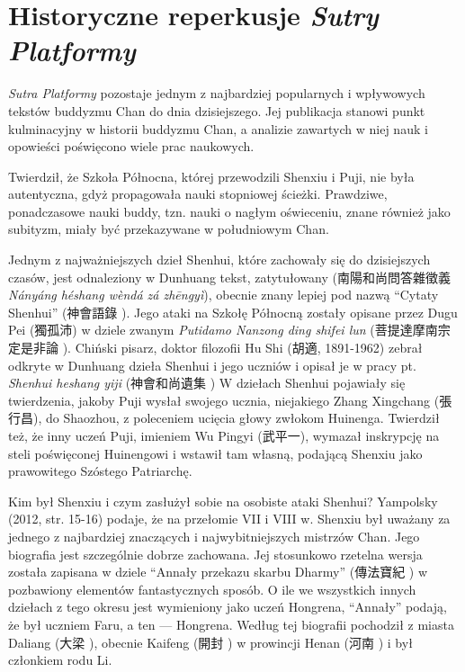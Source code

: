 \chapter{Historyczne reperkusje \textit{Sutry Platformy}}
\textit{Sutra Platformy} pozostaje jednym z najbardziej popularnych i wpływowych tekstów buddyzmu Chan do dnia dzisiejszego. Jej publikacja stanowi punkt kulminacyjny w historii buddyzmu Chan, a analizie zawartych w niej nauk i opowieści poświęcono wiele prac naukowych.

Twierdził, że Szkoła Północna, której przewodzili Shenxiu i Puji, nie była autentyczna, gdyż propagowała nauki stopniowej ścieżki. Prawdziwe, ponadczasowe nauki buddy, tzn. nauki o nagłym oświeceniu, znane również jako subityzm, miały być przekazywane w południowym Chan.

Jednym z najważniejszych dzieł Shenhui, które zachowały się do dzisiejszych czasów, jest odnaleziony w Dunhuang tekst, zatytułowany  (南陽和尚問答雜徵義 \textit{Nányáng héshang wèndá zá zhēngyì}), obecnie znany lepiej pod nazwą ``Cytaty Shenhui'' (神會語錄 ).
Jego ataki na Szkołę Północną zostały opisane przez Dugu Pei (獨孤沛) w dziele zwanym \textit{Putidamo Nanzong ding shifei lun} (菩提達摩南宗定是非論 ).
Chiński pisarz, doktor filozofii Hu Shi (胡適, 1891-1962) zebrał odkryte w Dunhuang dzieła Shenhui i jego uczniów i opisał je w pracy pt. \textit{Shenhui heshang yiji} (神會和尚遺集 )
W dziełach Shenhui pojawiały się twierdzenia, jakoby Puji wysłał swojego ucznia, niejakiego Zhang Xingchang (張行昌), do Shaozhou, z poleceniem ucięcia głowy zwłokom Huinenga.
Twierdził też, że inny uczeń Puji, imieniem Wu Pingyi (武平一), wymazał inskrypcję na steli poświęconej Huinengowi i wstawił tam własną, podającą Shenxiu jako prawowitego Szóstego Patriarchę.

Kim był Shenxiu i czym zasłużył sobie na osobiste ataki Shenhui? Yampolsky (2012, str. 15-16) podaje, że na przełomie VII i VIII w. Shenxiu był uważany za jednego z najbardziej znaczących i najwybitniejszych mistrzów Chan.
Jego biografia jest szczególnie dobrze zachowana. Jej stosunkowo rzetelna wersja została zapisana w dziele ``Annały przekazu skarbu Dharmy'' (傳法寶紀 ) w pozbawiony elementów fantastycznych sposób.
O ile we wszystkich innych dziełach z tego okresu jest wymieniony jako uczeń Hongrena, ``Annały'' podają, że był uczniem Faru, a ten --- Hongrena. Według tej biografii pochodził z miasta Daliang (大梁 ), obecnie Kaifeng (開封 ) w prowincji Henan (河南 ) i był członkiem rodu Li.

